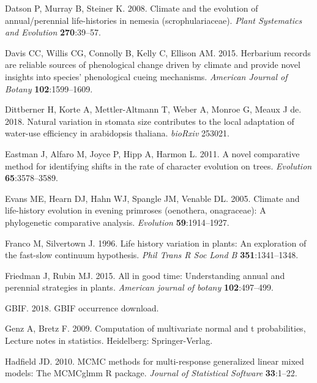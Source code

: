\documentclass[man,floatsintext]{apa6}
\theoremstyle{definition}
\theoremstyle{definition}
\theoremstyle{definition}
\theoremstyle{remark}
\begin{document}
\leavevmode\hypertarget{ref-datson2008climate}{}%
Datson P, Murray B, Steiner K. 2008. Climate and the evolution of
annual/perennial life-histories in nemesia (scrophulariaceae).
\emph{Plant Systematics and Evolution} \textbf{270}:39--57.

\leavevmode\hypertarget{ref-davis2015herbarium}{}%
Davis CC, Willis CG, Connolly B, Kelly C, Ellison AM. 2015. Herbarium
records are reliable sources of phenological change driven by climate
and provide novel insights into species' phenological cueing mechanisms.
\emph{American Journal of Botany} \textbf{102}:1599--1609.

\leavevmode\hypertarget{ref-dittberner2018natural}{}%
Dittberner H, Korte A, Mettler-Altmann T, Weber A, Monroe G, Meaux J de.
2018. Natural variation in stomata size contributes to the local
adaptation of water-use efficiency in arabidopsis thaliana.
\emph{bioRxiv} 253021.

\leavevmode\hypertarget{ref-R-geiger_b}{}%
Eastman J, Alfaro M, Joyce P, Hipp A, Harmon L. 2011. A novel
comparative method for identifying shifts in the rate of character
evolution on trees. \emph{Evolution} \textbf{65}:3578--3589.

\leavevmode\hypertarget{ref-evans2005climate}{}%
Evans ME, Hearn DJ, Hahn WJ, Spangle JM, Venable DL. 2005. Climate and
life-history evolution in evening primroses (oenothera, onagraceae): A
phylogenetic comparative analysis. \emph{Evolution}
\textbf{59}:1914--1927.

\leavevmode\hypertarget{ref-franco1996life}{}%
Franco M, Silvertown J. 1996. Life history variation in plants: An
exploration of the fast-slow continuum hypothesis. \emph{Phil Trans R
Soc Lond B} \textbf{351}:1341--1348.

\leavevmode\hypertarget{ref-friedman2015all}{}%
Friedman J, Rubin MJ. 2015. All in good time: Understanding annual and
perennial strategies in plants. \emph{American journal of botany}
\textbf{102}:497--499.

\leavevmode\hypertarget{ref-gbifdownload}{}%
GBIF. 2018. GBIF occurrence download.

\leavevmode\hypertarget{ref-R-mvtnorm}{}%
Genz A, Bretz F. 2009. Computation of multivariate normal and t
probabilities, Lecture notes in statistics. Heidelberg: Springer-Verlag.

\leavevmode\hypertarget{ref-R-MCMCglmm}{}%
Hadfield JD. 2010. MCMC methods for multi-response generalized linear
mixed models: The MCMCglmm R package. \emph{Journal of Statistical
Software} \textbf{33}:1--22.
\end{document}
